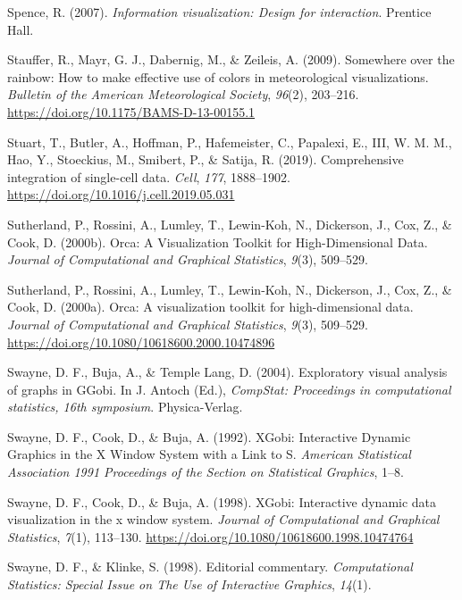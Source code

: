 \documentclass[
  letterpaper,
]{krantz}
\newlength{\cslhangindent}
\newenvironment{CSLReferences}[2] %
 {\begin{list}{}{%
  \setlength{\itemindent}{0pt}
  \setlength{\leftmargin}{0pt}
  \setlength{\parsep}{0pt}
  \ifodd #1
   \setlength{\leftmargin}{\cslhangindent}
   \setlength{\itemindent}{-1\cslhangindent}
  \fi
  \setlength{\itemsep}{#2\baselineskip}}}
 {\end{list}}
\begin{document}
\begin{CSLReferences}{1}{0}
Spence, R. (2007). \emph{Information visualization: Design for
interaction}. Prentice Hall.

Stauffer, R., Mayr, G. J., Dabernig, M., \& Zeileis, A. (2009).
Somewhere over the rainbow: How to make effective use of colors in
meteorological visualizations. \emph{Bulletin of the American
Meteorological Society}, \emph{96}(2), 203--216.
\url{https://doi.org/10.1175/BAMS-D-13-00155.1}

Stuart, T., Butler, A., Hoffman, P., Hafemeister, C., Papalexi, E., III,
W. M. M., Hao, Y., Stoeckius, M., Smibert, P., \& Satija, R. (2019).
Comprehensive integration of single-cell data. \emph{Cell}, \emph{177},
1888--1902. \url{https://doi.org/10.1016/j.cell.2019.05.031}

Sutherland, P., Rossini, A., Lumley, T., Lewin-Koh, N., Dickerson, J.,
Cox, Z., \& Cook, D. (2000b). Orca: {A} {V}isualization {T}oolkit for
{H}igh-{D}imensional {D}ata. \emph{Journal of Computational and
Graphical Statistics}, \emph{9}(3), 509--529.

Sutherland, P., Rossini, A., Lumley, T., Lewin-Koh, N., Dickerson, J.,
Cox, Z., \& Cook, D. (2000a). Orca: A visualization toolkit for
high-dimensional data. \emph{Journal of Computational and Graphical
Statistics}, \emph{9}(3), 509--529.
\url{https://doi.org/10.1080/10618600.2000.10474896}

Swayne, D. F., Buja, A., \& Temple Lang, D. (2004). Exploratory visual
analysis of graphs in {GG}obi. In J. Antoch (Ed.), \emph{CompStat:
Proceedings in computational statistics, 16th symposium}.
Physica-Verlag.

Swayne, D. F., Cook, D., \& Buja, A. (1992). {XG}obi: {I}nteractive
{D}ynamic {G}raphics in the {X} {W}indow {S}ystem with a {L}ink to {S}.
\emph{American Statistical Association 1991 Proceedings of the Section
on Statistical Graphics}, 1--8.

Swayne, D. F., Cook, D., \& Buja, A. (1998). XGobi: Interactive dynamic
data visualization in the x window system. \emph{Journal of
Computational and Graphical Statistics}, \emph{7}(1), 113--130.
\url{https://doi.org/10.1080/10618600.1998.10474764}

Swayne, D. F., \& Klinke, S. (1998). Editorial commentary.
\emph{Computational Statistics: Special Issue on The Use of Interactive
Graphics}, \emph{14}(1).


\end{CSLReferences}
\end{document}
